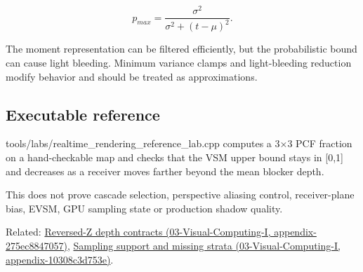 \[
p_{max}
=
\frac{\sigma^2}
{\sigma^2+(t-\mu)^2}.
\]

The moment representation can be filtered efficiently, but the probabilistic bound can cause light bleeding. Minimum variance clamps and light-bleeding reduction modify behavior and should be treated as approximations.

\subsection{Executable reference}\label{executable-reference}

tools/labs/realtime\_rendering\_reference\_lab.cpp computes a 3×3 PCF fraction on a hand-checkable map and checks that the VSM upper bound stays in {[}0,1{]} and decreases as a receiver moves farther beyond the mean blocker depth.

This does not prove cascade selection, perspective aliasing control, receiver-plane bias, EVSM, GPU sampling state or production shadow quality.

Related: \href{}{Reversed-Z depth contracts (03-Visual-Computing-I, appendix-275ec8847057)}, \href{}{Sampling support and missing strata (03-Visual-Computing-I, appendix-10308c3d753e)}.
